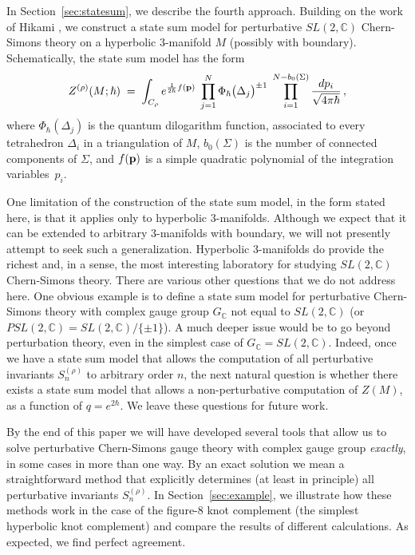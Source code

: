 \documentclass[hyper]{JHEP3}
\newcommand{\C}{{\mathbb{C}}}
\newcommand\be{\begin{equation}}
\newcommand\ee{\end{equation}}
\def\={\;=\;}
\begin{document}
In Section~\ref{sec:statesum}, we describe the fourth approach.
Building on the work of Hikami \cite{hikami-2001-16, hikami-2006},
we construct a state sum model for perturbative $SL(2,\C)$ Chern-Simons theory
on a hyperbolic 3-manifold $M$ (possibly with boundary).
Schematically, the state sum model has the form
  \be Z^{(\rho)} (M;\hbar) \= \int_{C_{\rho}} e^{\frac{1}{2 \hbar} f({\bf p})}\;
   \prod_{j=1}^{N} \Phi_{\hbar} \big( \Delta_j \big)^{\pm1}
   \; \prod_{i=1}^{N-b_0(\Sigma)} \frac{dp_i}{\sqrt{4\pi\hbar}}\,, \ee
where $\Phi_{\hbar} (\Delta_j)$ is the quantum dilogarithm function,
associated to every tetrahedron $\Delta_i$ in a triangulation of $M$,
$b_0 (\Sigma)$ is the number of connected components of $\Sigma$,
and $f({\bf p})$ is a simple quadratic polynomial of the integration variables~$p_i$.

One limitation of the construction of the state sum model, in the form stated here,
is that it applies only to hyperbolic 3-manifolds.
Although we expect that it can be extended to arbitrary 3-manifolds
with boundary, we will not presently attempt to seek such a generalization.
Hyperbolic 3-manifolds do provide the richest and, in a sense, the most
interesting laboratory for studying $SL(2,\C)$ Chern-Simons theory.
There are various other questions that we do not address here.
One obvious example is to define a state sum model
for perturbative Chern-Simons theory with complex gauge group $G_{\C}$
not equal to $SL(2,\C)$ (or $PSL(2,\C) = SL(2,\C)/ \{ \pm 1 \}$).
A much deeper issue would be to go beyond perturbation theory,
even in the simplest case of $G_{\C} = SL(2,\C)$.
Indeed, once we have a state sum model that allows the computation
of all perturbative invariants $S^{(\rho)}_n$ to arbitrary order $n$,
the next natural question is whether there exists a state sum
model that allows a non-perturbative computation of $Z(M)$, as a function of $q = e^{2 \hbar}$.
We leave these questions for future work.

By the end of this paper we will have developed several tools that allow us to solve
perturbative Chern-Simons gauge theory with complex gauge group {\it exactly},
in some cases in more than one way.
By an exact solution we mean
a straightforward method that explicitly determines
(at least in principle) all perturbative invariants $S_{n}^{(\rho)}$.
In Section~\ref{sec:example}, we illustrate how these methods work in the case
of the figure-8 knot complement (the simplest hyperbolic knot complement)
and compare the results of different calculations.
As expected, we find perfect agreement.
\end{document}
